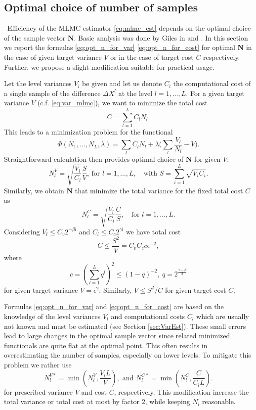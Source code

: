 \documentclass{article}
\def\vc#1{\mathbf{\boldsymbol{#1}}}     %
\begin{document}
\subsection{Optimal choice of number of samples}
\
Efficiency of the MLMC estimator \eqref{eq:mlmc_est} depends on the optimal choice of the sample vector $\vc N$. Basic analysis was done by Giles in \cite{Giles2008} and \cite{Giles2015}. In this section we report the formulas \eqref{eq:opt_n_for_var} \eqref{eq:opt_n_for_cost} for optimal $\vc N$ in the case of given target variance $V$ or in the case of target cost $C$ respectively. Further, we propose a slight modification suitable for practical usage.

Let  the level variances $V_l$ be given and let us denote $C_l$ the computational cost of a single sample of the difference $\Delta X^l$ at the level $l=1,\dots, L$. For a given target variance $V$ (c.f. \eqref{eq:var_mlmc}), we want to minimize the total cost
\begin{equation}
    \label{eq:total_cost}
	C = \sum_{l=1}^{L} C_l N_l.
\end{equation}
This leads to a minimization problem for the functional
\[
	\Phi(N_1, \dots, N_L,\lambda) = \sum_l C_l N_l + \lambda \Big(\sum_l \frac{V_l}{N_l} - V\Big).
\]
Straightforward calculation then provides optimal choice of $\vc N$ for given $V$:
\begin{equation}
	\label{eq:opt_n_for_var}
	N_l^V = \sqrt{\frac{V_l}{C_l}} \frac{S}{V},\ \text{for }l=1,\dots, L,\quad \text{with } S = \sum_{i=1}^L \sqrt{V_i C_i}.
\end{equation}
Similarly, we obtain $\vc N$ that minimize the total variance for the fixed total cost $C$ as
\begin{equation}
	\label{eq:opt_n_for_cost}
	N_l^C = \sqrt{\frac{V_l}{C_l}} \frac{C}{S}
	, \quad \text{for }l=1,\dots, L.
\end{equation}
Considering $V_l \le C_{v} 2^{-\beta l}$ and $C_l \le C_{c} 2^{\gamma l}$ we have total cost
\[
   C \le \frac{S^2}{V} = C_v C_c c \epsilon^{-2},
\]
where 
\[ 
   c = \left(\sum_{l=1}^{L} q^l\right)^2 \le (1-q)^{-2},\ q=2^\frac{\gamma - \beta}{2}
\]
for given target variance $V=\epsilon^2$. Similarly, $V \le S^2 / C$ for given target cost $C$.



Formulas \eqref{eq:opt_n_for_var} and \eqref{eq:opt_n_for_cost} are based on the knowledge of the level variances $V_l$ and computational costs $C_l$ which are usually not known and must be estimated (see Section \ref{sec:VarEst}). These small errors lead to large changes in the optimal sample vector since related minimized functionals are quite flat at the optimal point.  This often results in overestimating the number of samples, especially on lower levels. To mitigate this problem we rather use
\[
	N_l^{V*} = \min( N_l^V, \frac{V_l L}{V} ), \text{ and }
	N_l^{C*} = \min( N_l^C, \frac{C}{C_l L} ).
\]
for prescribed variance $V$ and cost $C$, respectively. This modification increase the total variance or total cost at most by factor $2$, while keeping  $N_l$ reasonable. 
\end{document}
